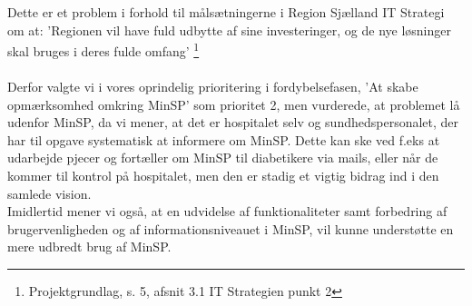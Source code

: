 Dette er et problem i forhold til målsætningerne i Region Sjælland IT Strategi om at: 'Regionen vil have fuld udbytte af sine investeringer, og de nye løsninger skal bruges i deres fulde omfang' \footnote{Projektgrundlag, s. 5, afsnit 3.1 IT Strategien punkt 2}\\
\\
Derfor valgte vi i vores oprindelig prioritering i fordybelsefasen, 'At skabe opmærksomhed omkring MinSP' som prioritet 2, men vurderede, at problemet lå udenfor MinSP, da vi mener, at det er hospitalet selv og sundhedspersonalet, der har til opgave systematisk at informere om MinSP. Dette kan ske ved f.eks at udarbejde pjecer og fortæller om MinSP til diabetikere via mails, eller når de kommer til kontrol på hospitalet, men den er stadig et vigtig bidrag ind i den samlede vision. \\
Imidlertid mener vi også, at en udvidelse af funktionaliteter samt forbedring af brugervenligheden og af informationsniveauet i MinSP, vil kunne understøtte en mere udbredt brug af MinSP.
